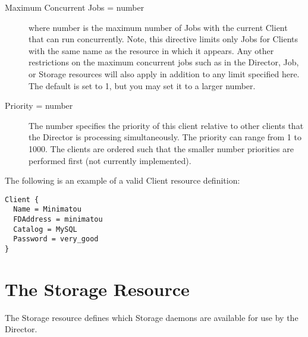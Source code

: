 \begin{description}
\item [Maximum Concurrent Jobs = \lt{}number\gt{}]
   where \lt{}number\gt{}  is the maximum number of Jobs with the current Client
   that  can run concurrently. Note, this directive limits only Jobs  for Clients
   with the same name as the resource in which it appears. Any  other
   restrictions on the maximum concurrent jobs such as in  the Director, Job, or
   Storage resources will also apply in addition to  any limit specified here.
   The  default is set to 1, but you may set it to a larger number.

\item [Priority = \lt{}number\gt{}]
   The number specifies the  priority of this client relative to other clients
   that the  Director is processing simultaneously. The priority can range  from
   1 to 1000. The clients are ordered such that the smaller  number priorities
   are performed first (not currently  implemented). 
\end{description}

   The following is an example of a valid Client resource definition: 

\footnotesize
\begin{verbatim}
Client {
  Name = Minimatou
  FDAddress = minimatou
  Catalog = MySQL
  Password = very_good
}
\end{verbatim}
\normalsize

\section{The Storage Resource}
\label{StorageResource2}

The Storage resource defines which Storage daemons are available for use by
the Director. 

